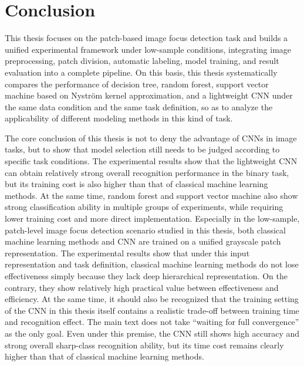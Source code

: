 \section{Conclusion}
\par This thesis focuses on the patch-based image focus detection task
\cite{Hou_2016_CVPR} and builds a unified experimental framework under
low-sample conditions, integrating image preprocessing, patch division,
automatic labeling, model training, and result evaluation into a complete
pipeline. On this basis, this thesis systematically compares the performance
of decision tree, random forest, support vector machine based on
Nystr\"{o}m kernel approximation, and a lightweight CNN
\cite{lecun2002gradient,krizhevsky2012imagenet} under the same data condition
and the same task definition, so as to analyze the applicability of different
modeling methods in this kind of task.

\par The core conclusion of this thesis is not to deny the advantage of CNNs in
image tasks, but to show that model selection still needs to be judged
according to specific task conditions. The experimental results show that the
lightweight CNN can obtain relatively strong overall recognition performance in
the binary task, but its training cost is also higher than that of classical
machine learning methods. At the same time, random forest and support vector
machine also show strong classification ability in multiple groups of
experiments, while requiring lower training cost and more direct
implementation. Especially in the low-sample, patch-level image focus
detection scenario studied in this thesis, both classical machine learning
methods and CNN are trained on a unified grayscale patch representation. The
experimental results show that under this input representation and task
definition, classical machine learning methods do not lose effectiveness simply
because they lack deep hierarchical representation. On the contrary, they show
relatively high practical value between effectiveness and efficiency. At the
same time, it should also be recognized that the training setting of the CNN
in this thesis itself contains a realistic trade-off between training time and
recognition effect. The main text does not take ``waiting for full
convergence'' as the only goal. Even under this premise, the CNN still shows
high accuracy and strong overall sharp-class recognition ability, but its time
cost remains clearly higher than that of classical machine learning methods.

